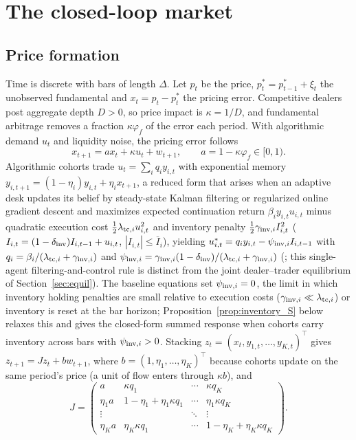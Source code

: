 \section{The closed-loop market}\label{sec:model}

\subsection{Price formation}
Time is discrete with bars of length $\Delta$. Let $p_t$ be the price, $p^*_t=p^*_{t-1}+\xi_t$ the unobserved fundamental and $x_t=p_t-p^*_t$ the pricing error. Competitive dealers post aggregate depth $D>0$, so price impact is $\kappa=1/D$, and fundamental arbitrage removes a fraction $\kappa\varphi_f$ of the error each period. With algorithmic demand $u_t$ and liquidity noise, the pricing error follows
\begin{equation}\label{eq:price}
x_{t+1}=ax_t+\kappa u_t+w_{t+1},\qquad a=1-\kappa\varphi_f\in[0,1).
\end{equation}
Algorithmic cohorts trade $u_t=\sum_iq_iy_{i,t}$ with exponential memory $y_{i,t+1}=(1-\eta_i)y_{i,t}+\eta_ix_{t+1}$, a reduced form that arises when an adaptive desk updates its belief by steady-state Kalman filtering or regularized online gradient descent and maximizes expected continuation return $\beta_i y_{i,t}u_{i,t}$ minus quadratic execution cost $\tfrac12\lambda_{{\rm tc},i}u_{i,t}^2$ and inventory penalty $\tfrac12\gamma_{{\rm inv},i}I_{i,t}^2$ ($I_{i,t}=(1-\delta_{\rm inv})I_{i,t-1}+u_{i,t}$, $|I_{i,t}|\le\bar I_i$), yielding $u_{i,t}^*=q_iy_{i,t}-\psi_{{\rm inv},i}I_{i,t-1}$ with $q_i=\beta_i/(\lambda_{{\rm tc},i}+\gamma_{{\rm inv},i})$ and $\psi_{{\rm inv},i}=\gamma_{{\rm inv},i}(1-\delta_{\rm inv})/(\lambda_{{\rm tc},i}+\gamma_{{\rm inv},i})$ (\citealp{niroula2026}; this single-agent filtering-and-control rule is distinct from the joint dealer--trader equilibrium of Section~\ref{sec:equil}). The baseline equations set $\psi_{{\rm inv},i}=0$, the limit in which inventory holding penalties are small relative to execution costs ($\gamma_{{\rm inv},i}\ll\lambda_{{\rm tc},i}$) or inventory is reset at the bar horizon; Proposition~\ref{prop:inventory_S} below relaxes this and gives the closed-form summed response when cohorts carry inventory across bars with $\psi_{{\rm inv},i}>0$. Stacking $z_t=(x_t,y_{1,t},\ldots,y_{K,t})^\top$ gives $z_{t+1}=Jz_t+bw_{t+1}$, where $b=(1,\eta_1,\ldots,\eta_K)^\top$ because cohorts update on the same period's price (a unit of flow enters through $\kappa b$), and
\begin{equation}\label{eq:J}
J=\begin{pmatrix} a & \kappa q_1 & \cdots & \kappa q_K\\ \eta_1 a & 1-\eta_1+\eta_1\kappa q_1 & \cdots & \eta_1\kappa q_K\\ \vdots & & \ddots & \vdots\\ \eta_K a & \eta_K\kappa q_1 & \cdots & 1-\eta_K+\eta_K\kappa q_K\end{pmatrix}.
\end{equation}

